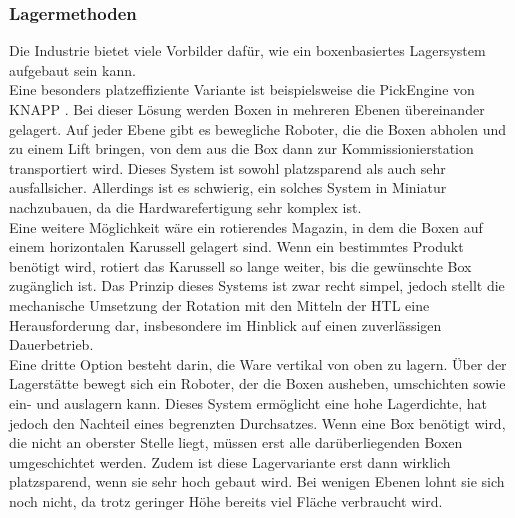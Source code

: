 \subsubsection{Lagermethoden}
Die Industrie bietet viele Vorbilder dafür, wie ein boxenbasiertes Lagersystem aufgebaut sein kann.
\\
Eine besonders platzeffiziente Variante ist beispielsweise die PickEngine von KNAPP \cite{pickengine}. Bei dieser Lösung werden Boxen in mehreren Ebenen übereinander gelagert. Auf jeder Ebene gibt es bewegliche Roboter, die die Boxen abholen und zu einem Lift bringen, von dem aus die Box dann zur Kommissionierstation transportiert wird. Dieses System ist sowohl platzsparend als auch sehr ausfallsicher. Allerdings ist es schwierig, ein solches System in Miniatur nachzubauen, da die Hardwarefertigung sehr komplex ist.
\\
Eine weitere Möglichkeit wäre ein rotierendes Magazin, in dem die Boxen auf einem horizontalen Karussell gelagert sind. Wenn ein bestimmtes Produkt benötigt wird, rotiert das Karussell so lange weiter, bis die gewünschte Box zugänglich ist. Das Prinzip dieses Systems ist zwar recht simpel, jedoch stellt die mechanische Umsetzung der Rotation mit den Mitteln der HTL eine Herausforderung dar, insbesondere im Hinblick auf einen zuverlässigen Dauerbetrieb.
\\
Eine dritte Option besteht darin, die Ware vertikal von oben zu lagern. Über der Lagerstätte bewegt sich ein Roboter, der die Boxen ausheben, umschichten sowie ein- und auslagern kann. Dieses System ermöglicht eine hohe Lagerdichte, hat jedoch den Nachteil eines begrenzten Durchsatzes. Wenn eine Box benötigt wird, die nicht an oberster Stelle liegt, müssen erst alle darüberliegenden Boxen umgeschichtet werden. Zudem ist diese Lagervariante erst dann wirklich platzsparend, wenn sie sehr hoch gebaut wird. Bei wenigen Ebenen lohnt sie sich noch nicht, da trotz geringer Höhe bereits viel Fläche verbraucht wird.



